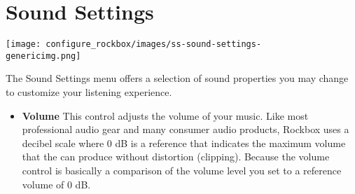 \section{Sound Settings}
\begin{center}
  \texttt{[image: configure\_rockbox/images/ss-sound-settings-\\genericimg.png]}
\end{center}

The Sound Settings menu offers a selection of sound properties you may change to customize your listening experience.

\begin{itemize}
\item \textbf{Volume}
  This control adjusts the volume of your music.  Like most professional audio gear and many consumer audio products, Rockbox uses a decibel scale where 0 dB is a reference that indicates the maximum volume that the \dap can produce without distortion (clipping).  Because the volume control is basically a comparison of the volume level you set to a reference volume of 0 dB.
  

\end{itemize}
